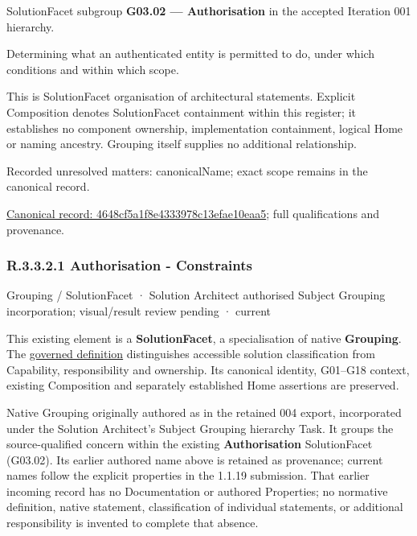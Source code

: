 SolutionFacet subgroup \textbf{G03.02 — Authorisation} in the accepted Iteration 001 hierarchy.



Determining what an authenticated entity is permitted to do, under which conditions and within which scope.



This is SolutionFacet organisation of architectural statements. Explicit Composition denotes SolutionFacet containment within this register; it establishes no component ownership, implementation containment, logical Home or naming ancestry. Grouping itself supplies no additional relationship.


{\small Recorded unresolved matters: canonicalName; exact scope remains in the canonical record.}\par
{\footnotesize \href{../../../../../../../continuum/grouping/4648cf5a1f8e4333978c13efae10eaa5.md}{Canonical record: 4648cf5a1f8e4333978c13efae10eaa5}; full qualifications and provenance.}\par
\subsubsection*{R.3.3.2.1 Authorisation - Constraints}
\label{navigation:R.3.3.2.1}

\label{element:c0ef85ab954f447fb244149dfcc44aad}
{\small Grouping / SolutionFacet · Solution Architect authorised Subject Grouping incorporation; visual/result review pending · current}\par

This existing element is a \textbf{SolutionFacet}, a specialisation of native
\textbf{Grouping}. The \href{\detokenize{../../../../../../../governance/continuum-representation.md#solutionfacet-classification--1119-candidate}}{governed definition}
distinguishes accessible solution classification from Capability, responsibility
and ownership. Its canonical identity, G01–G18 context, existing Composition
and separately established Home assertions are preserved.



Native Grouping originally authored as \texttt{} in the retained 004 export,
incorporated under the Solution Architect's Subject Grouping hierarchy Task.
It groups the source-qualified \texttt{} concern within
the existing \textbf{Authorisation} SolutionFacet (G03.02). Its earlier authored name above is retained as provenance; current names
follow the explicit properties in the 1.1.19 submission.
That earlier incoming record has no Documentation or authored Properties; no normative
definition, native statement, classification of individual statements, or
additional responsibility is invented to complete that absence.



